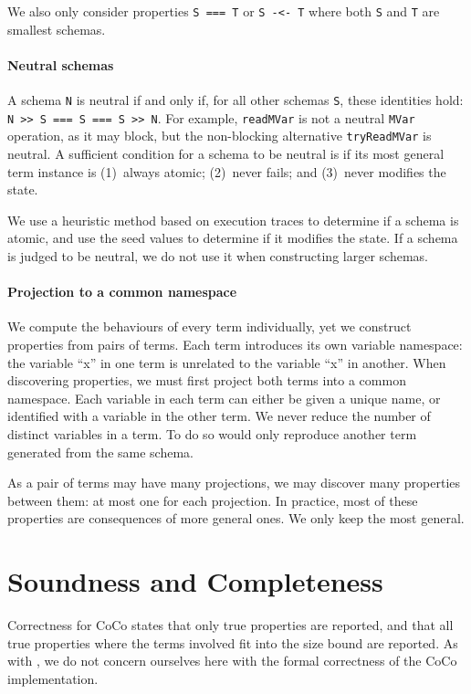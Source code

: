 We also only consider properties \verb|S === T| or \verb|S -<- T|
where both \verb|S| and \verb|T| are smallest schemas.

\paragraph{Neutral schemas}
A schema \verb|N| is neutral if and only if, for all other schemas
\verb|S|, these identities hold: \verb|N >> S === S === S >> N|.  For
example, \verb|readMVar| is not a neutral \verb|MVar| operation, as it
may block, but the non-blocking alternative \verb|tryReadMVar| is
neutral.  A sufficient condition for a schema to be neutral is if its
most general term instance is (1)~always atomic; (2)~never fails; and
(3)~never modifies the state.

We use a heuristic method based on execution traces to determine if a
schema is atomic, and use the seed values to determine if it modifies
the state.  If a schema is judged to be neutral, we do not use it when
constructing larger schemas.

\paragraph{Projection to a common namespace}
We compute the behaviours of every term individually, yet we construct
properties from pairs of terms.  Each term introduces its own variable
namespace: the variable ``x'' in one term is unrelated to the variable
``x'' in another.  When discovering properties, we must first project
both terms into a common namespace.  Each variable in each term can
either be given a unique name, or identified with a variable in the
other term.  We never reduce the number of distinct variables in a
term.  To do so would only reproduce another term generated from the
same schema.

As a pair of terms may have many projections, we may discover many
properties between them: at most one for each projection.  In
practice, most of these properties are consequences of more general
ones.  We only keep the most general.

\section{Soundness and Completeness}
\label{sec:coco-correctness}

Correctness for CoCo states that only true properties are reported,
and that all true properties where the terms involved fit into the
size bound are reported.  As with \dejafu{}, we do not concern
ourselves here with the formal correctness of the CoCo implementation.

